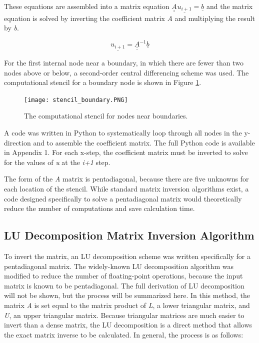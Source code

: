 \documentclass[10pt]{article}
\begin{document}
\vspace{11pt}
These equations are assembled into a matrix equation \textit{$\underline{\underline{A}}^{ } \underline{u_{i+1}} = \underline{b}$} and the matrix equation is solved by inverting the coefficient matrix \textit{A} and multiplying the result by \textit{b}. 

\vspace{-5pt}
\begin{equation}
\underline{u_{i+1}} = \underline{\underline{A}}^{-1} \underline{b}
\end{equation}

For the first internal node near a boundary, in which there are fewer than two nodes above or below, a second-order central differencing scheme was used. The computational stencil for a boundary node is shown in Figure \ref{stencil_boundary}. 

\begin{figure}[H]
	\begin{center}
		\texttt{[image: stencil\_boundary.PNG]}
  		\caption{The computational stencil for nodes near boundaries.}
  		\label{stencil_boundary}
	\end{center}
\end{figure}

A code was written in Python to systematically loop through all nodes in the y-direction and to assemble the coefficient matrix. The full Python code is available in Appendix 1. For each x-step, the coefficient matrix must be inverted to solve for the values of \textit{u} at the \textit{i+1} step.
\bigskip

The form of the \textit{A} matrix is pentadiagonal, because there are five unknowns for each location of the stencil. While standard matrix inversion algorithms exist, a code designed specifically to solve a pentadiagonal matrix would theoretically reduce the number of computations and save calculation time.

\subsection*{LU Decomposition Matrix Inversion Algorithm}
\vspace{-5pt}
To invert the matrix, an LU decomposition scheme was written specifically for a pentadiagonal matrix. The widely-known LU decomposition algorithm was modified to reduce the number of floating-point operations, because the input matrix is known to be pentadiagonal. The full derivation of LU decomposition will not be shown, but the process will be summarized here. In this method, the matrix \textit{A} is set equal to the matrix product of \textit{L}, a lower triangular matrix, and \textit{U}, an upper triangular matrix. Because triangular matrices are much easier to invert than a dense matrix, the LU decomposition is a direct method that allows the exact matrix inverse to be calculated. In general, the process is as follows:
\end{document}
